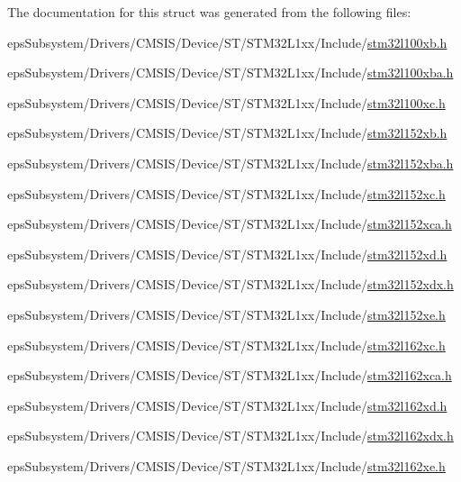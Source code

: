 The documentation for this struct was generated from the following files\-:\begin{DoxyCompactItemize}
\item 
eps\-Subsystem/\-Drivers/\-C\-M\-S\-I\-S/\-Device/\-S\-T/\-S\-T\-M32\-L1xx/\-Include/\hyperlink{stm32l100xb_8h}{stm32l100xb.\-h}\item 
eps\-Subsystem/\-Drivers/\-C\-M\-S\-I\-S/\-Device/\-S\-T/\-S\-T\-M32\-L1xx/\-Include/\hyperlink{stm32l100xba_8h}{stm32l100xba.\-h}\item 
eps\-Subsystem/\-Drivers/\-C\-M\-S\-I\-S/\-Device/\-S\-T/\-S\-T\-M32\-L1xx/\-Include/\hyperlink{stm32l100xc_8h}{stm32l100xc.\-h}\item 
eps\-Subsystem/\-Drivers/\-C\-M\-S\-I\-S/\-Device/\-S\-T/\-S\-T\-M32\-L1xx/\-Include/\hyperlink{stm32l152xb_8h}{stm32l152xb.\-h}\item 
eps\-Subsystem/\-Drivers/\-C\-M\-S\-I\-S/\-Device/\-S\-T/\-S\-T\-M32\-L1xx/\-Include/\hyperlink{stm32l152xba_8h}{stm32l152xba.\-h}\item 
eps\-Subsystem/\-Drivers/\-C\-M\-S\-I\-S/\-Device/\-S\-T/\-S\-T\-M32\-L1xx/\-Include/\hyperlink{stm32l152xc_8h}{stm32l152xc.\-h}\item 
eps\-Subsystem/\-Drivers/\-C\-M\-S\-I\-S/\-Device/\-S\-T/\-S\-T\-M32\-L1xx/\-Include/\hyperlink{stm32l152xca_8h}{stm32l152xca.\-h}\item 
eps\-Subsystem/\-Drivers/\-C\-M\-S\-I\-S/\-Device/\-S\-T/\-S\-T\-M32\-L1xx/\-Include/\hyperlink{stm32l152xd_8h}{stm32l152xd.\-h}\item 
eps\-Subsystem/\-Drivers/\-C\-M\-S\-I\-S/\-Device/\-S\-T/\-S\-T\-M32\-L1xx/\-Include/\hyperlink{stm32l152xdx_8h}{stm32l152xdx.\-h}\item 
eps\-Subsystem/\-Drivers/\-C\-M\-S\-I\-S/\-Device/\-S\-T/\-S\-T\-M32\-L1xx/\-Include/\hyperlink{stm32l152xe_8h}{stm32l152xe.\-h}\item 
eps\-Subsystem/\-Drivers/\-C\-M\-S\-I\-S/\-Device/\-S\-T/\-S\-T\-M32\-L1xx/\-Include/\hyperlink{stm32l162xc_8h}{stm32l162xc.\-h}\item 
eps\-Subsystem/\-Drivers/\-C\-M\-S\-I\-S/\-Device/\-S\-T/\-S\-T\-M32\-L1xx/\-Include/\hyperlink{stm32l162xca_8h}{stm32l162xca.\-h}\item 
eps\-Subsystem/\-Drivers/\-C\-M\-S\-I\-S/\-Device/\-S\-T/\-S\-T\-M32\-L1xx/\-Include/\hyperlink{stm32l162xd_8h}{stm32l162xd.\-h}\item 
eps\-Subsystem/\-Drivers/\-C\-M\-S\-I\-S/\-Device/\-S\-T/\-S\-T\-M32\-L1xx/\-Include/\hyperlink{stm32l162xdx_8h}{stm32l162xdx.\-h}\item 
eps\-Subsystem/\-Drivers/\-C\-M\-S\-I\-S/\-Device/\-S\-T/\-S\-T\-M32\-L1xx/\-Include/\hyperlink{stm32l162xe_8h}{stm32l162xe.\-h}\end{DoxyCompactItemize}
